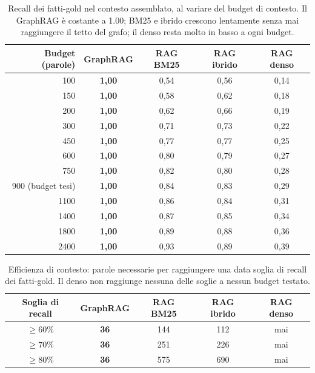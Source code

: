 \documentclass[11pt,a4paper]{report}
\begin{document}
\begin{table}[H]
\centering
\caption{Recall dei fatti-gold nel contesto assemblato, al variare del budget
di contesto. Il GraphRAG è costante a \num{1,00}; BM25 e ibrido crescono
lentamente senza mai raggiungere il tetto del grafo; il denso resta molto
in basso a ogni budget.}
\label{tab:recall-budget}
\small
\begin{tabular}{r cccc}
\toprule
Budget (parole) & GraphRAG & RAG BM25 & RAG ibrido & RAG denso \\
\midrule
100  & \textbf{1,00} & 0,54 & 0,56 & 0,14 \\
150  & \textbf{1,00} & 0,58 & 0,62 & 0,18 \\
200  & \textbf{1,00} & 0,62 & 0,66 & 0,19 \\
300  & \textbf{1,00} & 0,71 & 0,73 & 0,22 \\
450  & \textbf{1,00} & 0,77 & 0,77 & 0,25 \\
600  & \textbf{1,00} & 0,80 & 0,79 & 0,27 \\
750  & \textbf{1,00} & 0,82 & 0,80 & 0,28 \\
900 (budget tesi) & \textbf{1,00} & 0,84 & 0,83 & 0,29 \\
1100 & \textbf{1,00} & 0,86 & 0,84 & 0,31 \\
1400 & \textbf{1,00} & 0,87 & 0,85 & 0,34 \\
1800 & \textbf{1,00} & 0,89 & 0,88 & 0,36 \\
2400 & \textbf{1,00} & 0,93 & 0,89 & 0,39 \\
\bottomrule
\end{tabular}
\end{table}

\begin{table}[H]
\centering
\caption{Efficienza di contesto: parole necessarie per raggiungere una data
soglia di recall dei fatti-gold. Il denso non raggiunge nessuna delle soglie
a nessun budget testato.}
\label{tab:efficienza}
\small
\begin{tabular}{c cccc}
\toprule
Soglia di recall & GraphRAG & RAG BM25 & RAG ibrido & RAG denso \\
\midrule
$\geq 60\%$ & \textbf{36} & 144 & 112 & mai \\
$\geq 70\%$ & \textbf{36} & 251 & 226 & mai \\
$\geq 80\%$ & \textbf{36} & 575 & 690 & mai \\
\bottomrule
\end{tabular}
\end{table}
\end{document}
